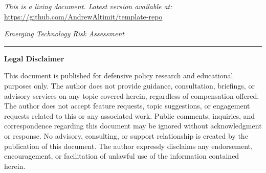 \documentclass[11pt,letterpaper]{article}
\makeatletter
\newcommand{\etraneed}[1]{\par\if@nobreak\else\penalty\z@\ifdim\pagegoal<\maxdimen\ifdim\dimexpr\pagegoal-\pagetotal\relax<\dimexpr#1\relax\newpage\fi\fi\fi}
\makeatother
\begin{document}
\vspace{0.5cm}

\begin{center}
\small
\textit{This is a living document. Latest version available at:}\\[0.3em]
\url{https://github.com/AndrewAltimit/template-repo}
\end{center}

\vspace{0.5cm}

\begin{center}
\textit{Emerging Technology Risk Assessment}
\end{center}

\vspace{1cm}

\etraneed{14\baselineskip}
\noindent\rule{\textwidth}{0.4pt}

\vspace{0.3cm}

\begin{center}
\small\textbf{Legal Disclaimer}
\end{center}

\vspace{0.2cm}

\noindent\small This document is published for defensive policy research and educational purposes only. The author does not provide guidance, consultation, briefings, or advisory services on any topic covered herein, regardless of compensation offered. The author does not accept feature requests, topic suggestions, or engagement requests related to this or any associated work. Public comments, inquiries, and correspondence regarding this document may be ignored without acknowledgment or response. No advisory, consulting, or support relationship is created by the publication of this document. The author expressly disclaims any endorsement, encouragement, or facilitation of unlawful use of the information contained herein.
\end{document}
